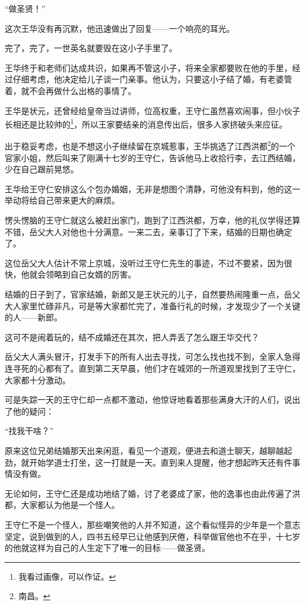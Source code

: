 \begin{multicols}{\theparacolNo}
		“做圣贤！”

		这次王华没有再沉默，他迅速做出了回复——一个响亮的耳光。

		完了，完了，一世英名就要毁在这小子手里了。

		王华终于和老师们达成共识，如果再不管这小子，将来全家都要败在他的手里，经过仔细考虑，他决定给儿子谈一门亲事。他认为，只要这小子结了婚，有老婆管着，就不会再做什么出格的事情了。

		王华是状元，还曾经给皇帝当过讲师，位高权重，王守仁虽然喜欢闹事，但小伙子长相还是比较帅的\footnote{我看过画像，可以作证。}，所以王家要结亲的消息传出后，很多人家挤破头来应征。

		出于稳妥考虑，也是不想这小子继续留在京城惹事，王华挑选了江西洪都\footnote{南昌。}的一个官家小姐，然后叫来了刚满十七岁的王守仁，告诉他马上收拾行李，去江西结婚，少在自己跟前晃悠。

		王华给王守仁安排这么个包办婚姻，无非是想图个清静，可他没有料到，他的这一举动将给自己带来更大的麻烦。

		愣头愣脑的王守仁就这么被赶出家门，跑到了江西洪都，万幸，他的礼仪学得还算不错，岳父大人对他也十分满意。一来二去，亲事订了下来，结婚的日期也确定了。

		这位岳父大人估计不常上京城，没听过王守仁先生的事迹，不过不要紧，因为很快，他就会领略到自己女婿的厉害。

		结婚的日子到了，官家结婚，新郎又是王状元的儿子，自然要热闹隆重一点，岳父大人家里忙碌非凡，可是等大家都忙完了，准备行礼的时候，才发现少了一个关键的人——新郎。

		这可不是闹着玩的，结不成婚还在其次，把人弄丢了怎么跟王华交代？

		岳父大人满头冒汗，打发手下的所有人出去寻找，可怎么找也找不到，全家人急得连寻死的心都有了。直到第二天早晨，他们才在城郊的一所道观里找到了王守仁，大家都十分激动。

		可是失踪一天的王守仁却一点都不激动，他惊讶地看着那些满身大汗的人们，说出了他的疑问：

		“找我干啥？”

		原来这位兄弟结婚那天出来闲逛，看见一个道观，便进去和道士聊天，越聊越起劲，就开始学道士打坐，这一打就是一天。直到来人提醒，他才想起昨天还有件事情没有做。

		无论如何，王守仁还是成功地结了婚，讨了老婆成了家，他的逸事也由此传遍了洪都，大家都认为他是一个怪人。

		王守仁不是一个怪人，那些嘲笑他的人并不知道，这个看似怪异的少年是一个意志坚定，说到做到的人，四书五经早已让他感到厌倦，科举做官他也不在乎，十七岁的他就这样为自己的人生定下了唯一的目标——做圣贤。


\end{multicols}
